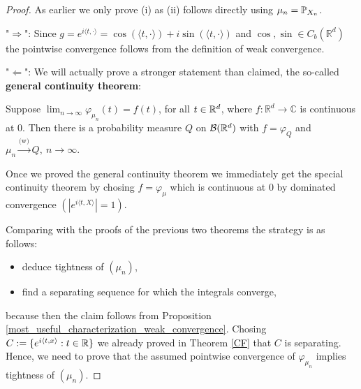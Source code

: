 \begin{proof}[Proof]
As earlier we only prove (i) as (ii) follows directly using $\mu_n=\P_{X_n}$.\smallskip

"$\Rightarrow$": Since $g = e^{i \langle t, \cdot \rangle}=\cos(\langle t,\cdot\rangle)+i\sin(\langle t,\cdot\rangle)$ and $\cos,\sin\in C_b(\mathbb{R}^d)$ the pointwise convergence follows from the definition of weak convergence.\smallskip

"$\Leftarrow$": We will actually prove a stronger statement than claimed, the so-called \textbf{general continuity theorem}:
\begin{lwarnhinweis}
	Suppose $\lim_{n\to\infty}\varphi_{\mu_n}(t)= f(t)$, for all $t\in\R^d$, where $f \colon \mathbb{R}^d \to \mathbb{C}$ is continuous at $0$. Then there is a probability measure $Q$ on $\cB(\R^d)$ with $f = \varphi_Q$ and $\mu_n \overset{\text{(w)}}{\longrightarrow} Q, \: n\to \infty$.
\end{lwarnhinweis}
Once we proved the general continuity theorem we immediately get the special continuity theorem by chosing $f=\varphi_\mu$ which is continuous at $0$ by dominated convergence $(|e^{i\langle t,X\rangle}|=1)$.\smallskip

Comparing with the proofs of the previous two theorems the strategy is as follows:
\begin{itemize}
	\item deduce tightness of $(\mu_n)$,
	\item find a separating sequence for which the integrals converge,
\end{itemize}
because then the claim follows from Proposition \ref{most_useful_characterization_weak_convergence}. Chosing $C:=\{e^{i\langle t,x\rangle}: t\in\R\}$ we already proved in Theorem \ref{CF} that $C$ is separating. Hence, we need to prove that the assumed pointwise convergence of $\varphi_{\mu_n}$ implies tightness of $(\mu_n)$.\smallskip


\end{proof}
